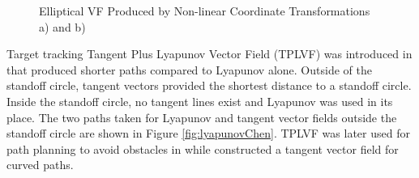 \documentclass[numbered,pdftex]{ohio-etd}
\begin{document}
\begin{figure}[h]
	\begin{subfigmatrix}{2}%
		\centering
	\end{subfigmatrix}
	\caption{Elliptical VF Produced by Non-linear Coordinate Transformations a)\cite{frew_cooperative_2007} and b) \cite{frew_lyapunov_nodate}}
	\label{fig:lyapunovFrew}
\end{figure}

Target tracking Tangent Plus Lyapunov Vector Field (TPLVF) was introduced in \cite{chen_tracking_2009} that produced shorter paths compared to Lyapunov alone. Outside of the standoff circle, tangent vectors provided the shortest distance to a standoff circle. Inside the standoff circle, no tangent lines exist and Lyapunov was used in its place. The two paths taken for Lyapunov and tangent vector fields outside the standoff circle are shown in Figure \ref{fig:lyapunovChen}. TPLVF was later used for path planning to avoid obstacles in \cite{chen_uav_2013} while \cite{liang_tangent_2017} constructed a tangent vector field for curved paths.
\end{document}
